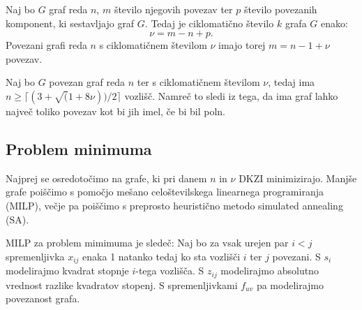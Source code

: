 \documentclass[fin1, tisk]{fmfdelo}
\begin{document}
\begin{definicija}
  Naj bo $G$ graf reda $n$, $m$ število njegovih povezav ter $p$ število 
  povezanih komponent, ki sestavljajo graf $G$. Tedaj je ciklomatično 
  število $k$ grafa $G$ enako:
  \[\nu = m - n + p.\]
  Povezani grafi reda $n$ s ciklomatičnem številom $\nu$ imajo torej $m=n - 1 + \nu$ povezav.
\end{definicija}

\begin{trditev}
  Naj bo $G$ povezan graf reda $n$ ter s ciklomatičnem številom $\nu$, tedaj 
  ima $n \geq \lceil (3 + \sqrt(1 + 8\nu))/2 \rceil$ vozlišč. Namreč to sledi iz tega,
  da ima graf lahko največ toliko povezav kot bi jih imel, če bi bil poln.
\end{trditev}

\subsection{Problem minimuma}

Najprej se osredotočimo na grafe, ki pri danem $n$ in $\nu$ DKZI
minimizirajo. Manjše grafe poiščimo s pomočjo mešano celoštevilskega linearnega programiranja
(MILP),
večje pa poiščimo s preprosto heuristično metodo simulated annealing (SA).

MILP za problem mimimuma je sledeč: 
Naj bo za vsak urejen par $i < j$ spremenljivka $x_{ij}$ enaka 1 natanko tedaj 
ko sta vozlišči $i$ ter $j$ povezani. S $s_i$ modelirajmo kvadrat stopnje $i$-tega vozlišča.
S $z_{ij}$ modelirajmo absolutno vrednost razlike kvadratov stopenj. S spremenljivkami 
$f_{uv}$ pa modelirajmo povezanost grafa.
\end{document}
